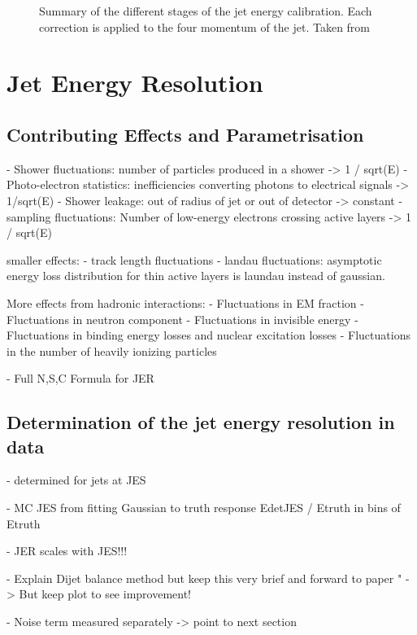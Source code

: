 \begin{figure}
    \caption{Summary of the different stages of the jet energy calibration. Each correction is applied to the four momentum of the jet. Taken from }
    \label{fig:jes-calibration}
\end{figure}



\section{Jet Energy Resolution}


\subsection{Contributing Effects and Parametrisation}
- Shower fluctuations: number of particles produced in a shower -> 1 / sqrt(E)
- Photo-electron statistics: inefficiencies converting photons to electrical signals -> 1/sqrt(E)
- Shower leakage: out of radius of jet or out of detector  -> constant
- sampling fluctuations: Number of low-energy electrons crossing active layers -> 1 / sqrt(E)

smaller effects:
- track length fluctuations
- landau fluctuations: asymptotic energy loss distribution for thin active layers is laundau instead of gaussian.

More effects from hadronic interactions:
- Fluctuations in EM fraction
- Fluctuations in neutron component
- Fluctuations in invisible energy
- Fluctuations in binding energy losses and nuclear excitation losses
- Fluctuations in the number of heavily ionizing particles

- Full N,S,C Formula for JER


\subsection{Determination of the jet energy resolution in data}

- determined for jets at JES

- MC JES from fitting Gaussian to truth response EdetJES / Etruth in bins of Etruth

- JER scales with JES!!!

- Explain Dijet balance method but keep this very brief and forward to paper "
-> But keep plot to see improvement!

- Noise term measured separately -> point to next section


